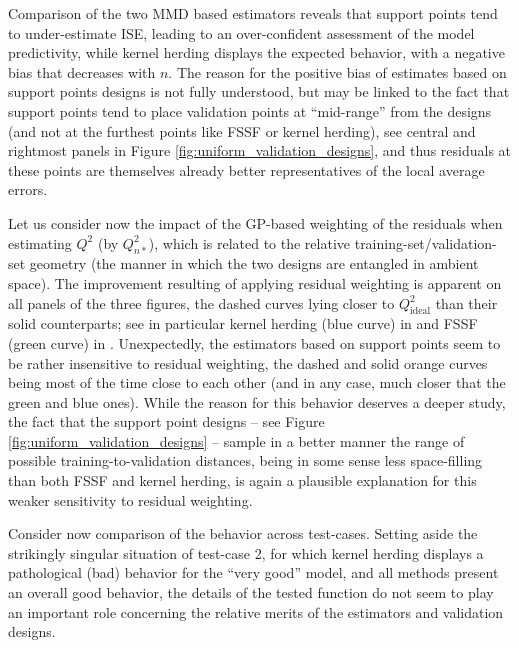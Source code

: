 Comparison of the two MMD based estimators reveals that support points tend to under-estimate ISE, leading to an over-confident assessment of the model predictivity, while kernel herding displays the expected behavior, with a negative bias that decreases with $n$. 
The reason for the positive bias of estimates based on support points designs is not fully understood, but may be linked to the fact that support points tend to place validation points at ``mid-range'' from the designs (and not at the furthest points like FSSF or kernel herding), see central and rightmost panels in Figure \ref{fig:uniform_validation_designs}, and thus residuals at these points are themselves already better representatives of the local average errors. 

Let us consider now the impact of the GP-based weighting of the residuals when estimating $Q^2$ (by $Q_{n*}^2$), which is related to the relative training-set/validation-set geometry (the manner in which the two designs are entangled in ambient space). 
The improvement resulting of applying residual weighting is apparent on all panels of the three figures, the dashed curves lying closer to $Q_{\mathrm{ideal}}^2$ than their solid counterparts; see in particular kernel herding (blue curve) in  and FSSF (green curve) in . 
Unexpectedly, the estimators based on support points seem to be rather insensitive to residual weighting, the dashed and solid orange curves being most of the time close to each other (and in any case, much closer that the green and blue ones). 
While the reason for this behavior deserves a deeper study, the fact that the support point designs -- see Figure \ref{fig:uniform_validation_designs} -- sample in a better manner the range of possible training-to-validation distances, being in some sense less space-filling than both FSSF and kernel herding, is again a plausible explanation for this weaker sensitivity to residual weighting.


Consider now comparison of the behavior across test-cases. 
Setting aside the strikingly singular situation of test-case 2, for which kernel herding displays a pathological (bad) behavior for the ``very good'' model, 
and all methods present an overall good behavior, 
the details of the tested function do not seem to play an important role concerning the relative merits of the estimators and validation designs.

